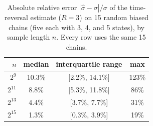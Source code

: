 \begin{table}[h!]
\centering
\caption{Absolute relative error $|\hat\sigma-\sigma|/\sigma$ of the time-reversal estimate ($R=3$) on 15 random biased chains (five each with 3, 4, and 5 states), by sample length $n$. Every row uses the same 15 chains.}
\label{tab:markov}
\begin{tabular}{rccc}
\toprule
$n$ & median & interquartile range & max \\
\midrule
$2^{9}$ & 10.3\% & [2.2\%, 14.1\%] & 123\% \\
$2^{11}$ & 8.8\% & [5.3\%, 11.8\%] & 86\% \\
$2^{13}$ & 4.4\% & [3.7\%, 7.7\%] & 31\% \\
$2^{15}$ & 1.3\% & [0.3\%, 3.9\%] & 19\% \\
\bottomrule
\end{tabular}
\end{table}
